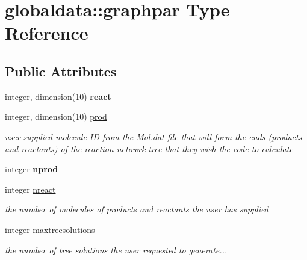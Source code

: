 \hypertarget{structglobaldata_1_1graphpar}{}\section{globaldata\+:\+:graphpar Type Reference}
\label{structglobaldata_1_1graphpar}
\subsection*{Public Attributes}
\begin{DoxyCompactItemize}
\item 
\mbox{\label{structglobaldata_1_1graphpar_a15beab6e6784850319e9b0ca78fd62df}} 
integer, dimension(10) {\bfseries react}
\item 
\mbox{\label{structglobaldata_1_1graphpar_a1d29ff9b141fecf7b139e648d8ed9a70}} 
integer, dimension(10) \mbox{\hyperlink{structglobaldata_1_1graphpar_a1d29ff9b141fecf7b139e648d8ed9a70}{prod}}
\begin{DoxyCompactList}\small\item\em user supplied molecule ID from the Mol.\+dat file that will form the ends (products and reactants) of the reaction netowrk tree that they wish the code to calculate \end{DoxyCompactList}\item 
\mbox{\label{structglobaldata_1_1graphpar_a7bbb885be8abaf0cd6e6c32148ef904e}} 
integer {\bfseries nprod}
\item 
\mbox{\label{structglobaldata_1_1graphpar_a6d5b296eaf483d68cb5715e92bae69f9}} 
integer \mbox{\hyperlink{structglobaldata_1_1graphpar_a6d5b296eaf483d68cb5715e92bae69f9}{nreact}}
\begin{DoxyCompactList}\small\item\em the number of molecules of products and reactants the user has supplied \end{DoxyCompactList}\item 
\mbox{\label{structglobaldata_1_1graphpar_a23f7b793f3d8c8a51e0f88504bc9daf3}} 
integer \mbox{\hyperlink{structglobaldata_1_1graphpar_a23f7b793f3d8c8a51e0f88504bc9daf3}{maxtreesolutions}}
\begin{DoxyCompactList}\small\item\em the number of tree solutions the user requested to generate... \end{DoxyCompactList}\item 

\end{DoxyCompactItemize}
